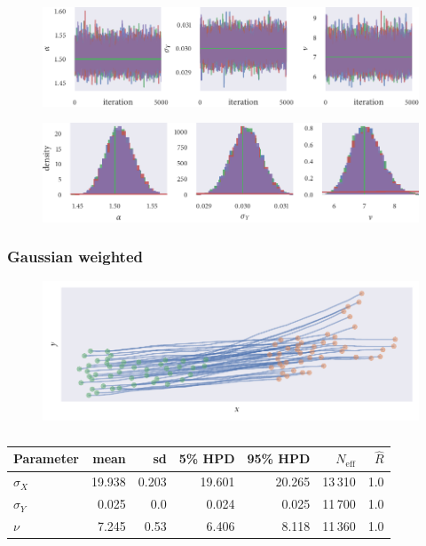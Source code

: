 \begin{figure}[tb]
    \includegraphics{stan_power_trace.pdf}
    \caption{}
    \label{fig:power_sim_study_chains}
\end{figure}

\begin{figure}[tb]
    \includegraphics{stan_power_hist.pdf}
    \caption{}
    \label{fig:power_sim_study_hists}
\end{figure}

\subsubsection{Gaussian weighted}

\begin{figure}[tb]
    \includegraphics{gauss_sim.pdf}
    \caption{}
\end{figure}

\begin{table}[tb]
\begin{tabular}{@{}lrrrrrr@{}}
\toprule
Parameter &  mean &   sd & 5\% HPD & 95\% HPD & $N_{\textrm{eff}}$ & $\hat{R}$ \\
\midrule
$\sigma_{X}$ & 19.938 & 0.203 &  19.601 &   20.265 &            13\,310 &       1.0 \\
$\sigma_{Y}$ & 0.025 & 0.0 &   0.024 &    0.025 &            11\,700 &       1.0 \\
$\nu$ & 7.245 & 0.53 &   6.406 &    8.118 &            11\,360 &       1.0 \\
\bottomrule
\end{tabular}
\caption{}
\end{table}

